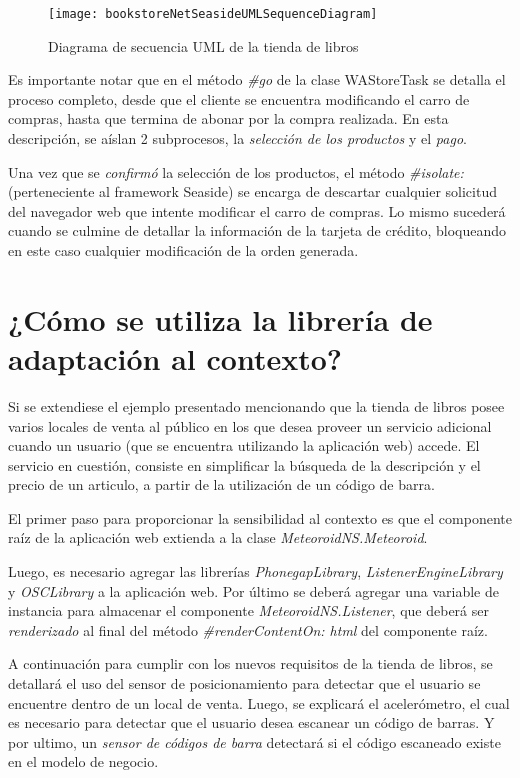 \begin{figure}[ht!]
\centering
\texttt{[image: bookstoreNetSeasideUMLSequenceDiagram]}
\caption{Diagrama de secuencia UML de la tienda de libros}
\label{bookstoreNetSequenceDiagram}
\end{figure}

Es importante notar que en el método \emph{\#go} de la clase WAStoreTask se detalla el proceso completo, desde que el cliente se encuentra modificando el carro de compras, hasta que termina de abonar por la compra realizada. En esta descripción, se aíslan 2 subprocesos, la \emph{selección de los productos} y el \emph{pago}.

Una vez que se \emph{confirmó} la selección de los productos, el método \emph{\#isolate:} (perteneciente al framework Seaside) se encarga de descartar cualquier solicitud del navegador web que intente modificar el carro de compras. Lo mismo sucederá cuando se culmine de detallar la información de la tarjeta de crédito, bloqueando en este caso cualquier modificación de la orden generada.


\section{¿Cómo se utiliza la librería de adaptación al contexto?}

Si se extendiese el ejemplo presentado mencionando que la tienda de libros posee varios locales de venta al público en los que desea proveer un servicio adicional cuando un usuario (que se encuentra utilizando la aplicación web) accede. El servicio en cuestión, consiste en simplificar la búsqueda de la descripción y el precio de un articulo, a partir de la utilización de un código de barra.

El primer paso para proporcionar la sensibilidad al contexto es que el componente raíz de la aplicación web extienda a la clase \emph{MeteoroidNS.Meteoroid}.

Luego, es necesario agregar las librerías \emph{PhonegapLibrary}, \emph{ListenerEngineLibrary} y \emph{OSCLibrary} a la aplicación web. Por último se deberá agregar una variable de instancia para almacenar el componente \emph{MeteoroidNS.Listener}, que deberá ser \emph{renderizado} al final del método \emph{\#renderContentOn: html} del componente raíz.

A continuación para cumplir con los nuevos requisitos de la tienda de libros, se detallará el uso del sensor de posicionamiento para detectar que el usuario se encuentre dentro de un local de venta. Luego, se explicará el acelerómetro, el cual es necesario para detectar que el usuario desea escanear un código de barras. Y por ultimo, un \emph{sensor de códigos de barra} detectará si el código escaneado existe en el modelo de negocio.



